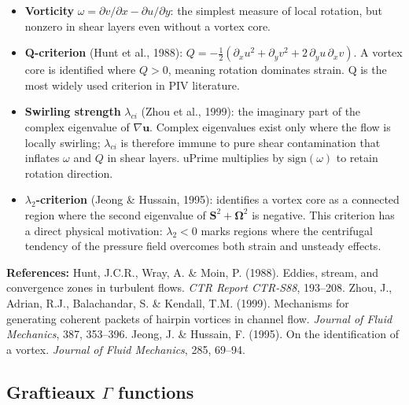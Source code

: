 \documentclass[11pt, a4paper]{report}
\begin{document}
\begin{itemize}[leftmargin=1.5em]
  \item \textbf{Vorticity} $\omega = \partial v/\partial x - \partial u/\partial y$: the simplest measure of local rotation, but nonzero in shear layers even without a vortex core.

  \item \textbf{Q-criterion} (Hunt et al., 1988): $Q = -\tfrac{1}{2}(\partial_x u^2 + \partial_y v^2 + 2\,\partial_y u\,\partial_x v)$. A vortex core is identified where $Q > 0$, meaning rotation dominates strain. Q is the most widely used criterion in PIV literature.

  \item \textbf{Swirling strength} $\lambda_{ci}$ (Zhou et al., 1999): the imaginary part of the complex eigenvalue of $\nabla\mathbf{u}$. Complex eigenvalues exist only where the flow is locally swirling; $\lambda_{ci}$ is therefore immune to pure shear contamination that inflates $\omega$ and $Q$ in shear layers. uPrime multiplies by $\text{sign}(\omega)$ to retain rotation direction.

  \item \textbf{$\lambda_2$-criterion} (Jeong \& Hussain, 1995): identifies a vortex core as a connected region where the second eigenvalue of $\mathbf{S}^2 + \boldsymbol{\Omega}^2$ is negative. This criterion has a direct physical motivation: $\lambda_2 < 0$ marks regions where the centrifugal tendency of the pressure field overcomes both strain and unsteady effects.
\end{itemize}

\noindent\textbf{References:} Hunt, J.C.R., Wray, A. \& Moin, P. (1988). Eddies, stream, and convergence zones in turbulent flows. \textit{CTR Report CTR-S88}, 193--208. Zhou, J., Adrian, R.J., Balachandar, S. \& Kendall, T.M. (1999). Mechanisms for generating coherent packets of hairpin vortices in channel flow. \textit{Journal of Fluid Mechanics}, 387, 353--396. Jeong, J. \& Hussain, F. (1995). On the identification of a vortex. \textit{Journal of Fluid Mechanics}, 285, 69--94.

\subsection*{Graftieaux $\Gamma$ functions}
\end{document}
